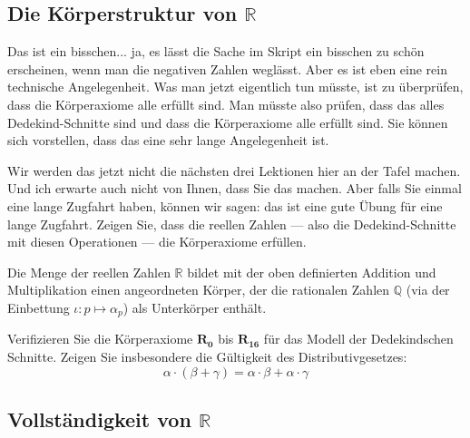 \subsection{Die Körperstruktur von \texorpdfstring{$\mathbb{R}$}{R}}

\begin{spoken-clean}[01:10:00 - 01:12:45]
Das ist ein bisschen... ja, es lässt die Sache im Skript ein bisschen zu schön erscheinen, wenn man die negativen Zahlen weglässt. Aber es ist eben eine rein technische Angelegenheit. Was man jetzt eigentlich tun müsste, ist zu überprüfen, dass die Körperaxiome alle erfüllt sind. Man müsste also prüfen, dass das alles Dedekind-Schnitte sind und dass die Körperaxiome alle erfüllt sind. Sie können sich vorstellen, dass das eine sehr lange Angelegenheit ist.

Wir werden das jetzt nicht die nächsten drei Lektionen hier an der Tafel machen. Und ich erwarte auch nicht von Ihnen, dass Sie das machen. Aber falls Sie einmal eine lange Zugfahrt haben, können wir sagen: das ist eine gute Übung für eine lange Zugfahrt. Zeigen Sie, dass die reellen Zahlen --- also die Dedekind-Schnitte mit diesen Operationen --- die Körperaxiome erfüllen.
\end{spoken-clean}

\begin{math-stroke}
\begin{theorem}\label{thm:reelle-zahlen-koerper}
Die Menge der reellen Zahlen $\mathbb{R}$ bildet mit der oben definierten Addition und Multiplikation einen angeordneten Körper, der die rationalen Zahlen $\mathbb{Q}$ (via der Einbettung $\iota \colon p \mapsto \alpha_p$) als Unterkörper enthält.
\end{theorem}

\begin{exercise}
Verifizieren Sie die Körperaxiome $\mathbf{R_0}$ bis $\mathbf{R_{16}}$ für das Modell der Dedekindschen Schnitte. Zeigen Sie insbesondere die Gültigkeit des Distributivgesetzes:
\[ \alpha \cdot (\beta + \gamma) = \alpha \cdot \beta + \alpha \cdot \gamma \]
\end{exercise}
\end{math-stroke}

\subsection{Vollständigkeit von \texorpdfstring{$\mathbb{R}$}{R}}

